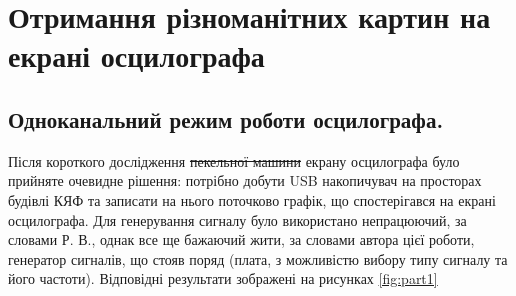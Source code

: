 \chapter{Отримання різноманітних картин на екрані осцилографа} 
\label{chapter:first}

\section{Одноканальний режим роботи осцилографа.}

Після короткого дослідження \sout{пекельної машини} екрану осцилографа було прийняте очевидне рішення: потрібно добути USB накопичувач на просторах будівлі КЯФ та записати на нього поточково графік, що спостерігався на екрані осцилографа. Для генерування сигналу було використано непрацюючий, за словами Р. В., однак все ще бажаючий жити, за словами автора цієї роботи, генератор сигналів, що стояв поряд (плата, з можливістю вибору типу сигналу та його частоти). Відповідні результати зображені на рисунках \ref{fig:part1}

